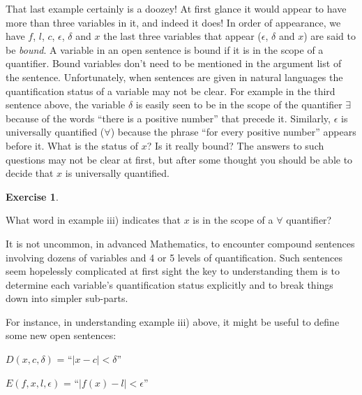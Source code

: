\documentclass[10pt,]{book}
\theoremstyle{plain}
\theoremstyle{definition}
\theoremstyle{definition}
\newtheorem{exercise}[theorem]{Exercise}
\numberwithin{equation}{section}
\newcommand{\lt}{ < }
\begin{document}
\par

    That last example certainly is a doozey! At first glance it would appear
    to have more than three variables in it, and indeed it does! In order of
    appearance, we have \(f\), \(l\), \(c\), \(\epsilon\), \(\delta\) and \(x\) \textemdash{} the
    last three variables that appear (\(\epsilon\), \(\delta\) and \(x\)) are said
    to be \emph{bound}.
    A variable in an open sentence is bound if it is in the
    scope of a quantifier. Bound variables don't need to be mentioned
    in the argument list of the sentence. Unfortunately, when sentences are
    given in natural languages the quantification status of a variable may
    not be clear. For example in the third sentence above, the variable \(\delta\)
    is easily seen to be in the scope of the quantifier \(\exists\) because of the
    words ``there is a positive number'' that precede it. Similarly, \(\epsilon\)
    is universally quantified (\(\forall\)) because the phrase ``for every positive
    number'' appears before it. What is the status of \(x\)? Is it really bound?
    The answers to such questions may not be clear at first, but after some
    thought you should be able to decide that \(x\) is universally quantified.
\begin{exercise}\label{exercise-12}

        What word in example iii) indicates that \(x\) is in the
        scope of a \(\forall\) quantifier?
\end{exercise}
\par

    It is not uncommon, in advanced Mathematics, to encounter compound sentences
    involving dozens of variables and 4 or 5 levels of quantification. Such
    sentences seem hopelessly complicated at first sight \textemdash{} the key to
    understanding them is to determine each variable's quantification status
    explicitly and to break things down into simpler sub-parts.
\par

    For instance, in understanding example iii) above, it might be
    useful to define some new open sentences:
\par

    \(D(x,c,\delta)\) = ``\(|x-c| \lt  \delta\)''
\par

    \(E(f,x,l,\epsilon)\) = ``\(|f(x)-l| \lt  \epsilon\)''
\par
\end{document}
